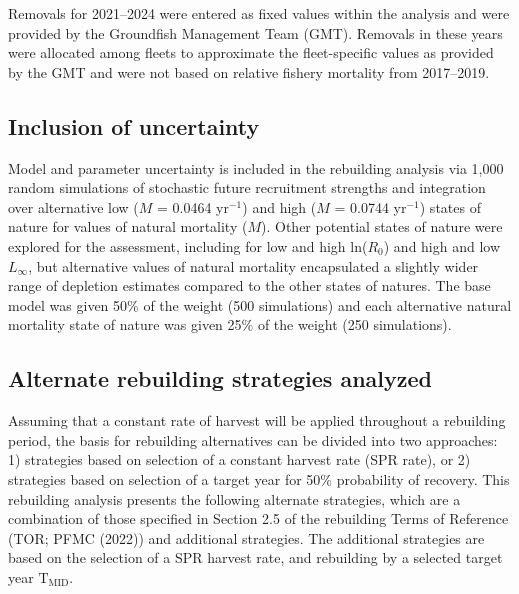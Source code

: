 \documentclass[11pt,
  letterpaper,
]{article}
\begin{document}
Removals for 2021--2024 were entered as fixed values within the analysis and were provided by the Groundfish Management Team (GMT). Removals in these years were allocated among fleets to approximate the fleet-specific values as provided by the GMT and were not based on relative fishery mortality from 2017--2019.

\hypertarget{inclusion-of-uncertainty}{%
\subsection{Inclusion of uncertainty}\label{inclusion-of-uncertainty}}

Model and parameter uncertainty is included in the rebuilding analysis via 1,000 random simulations of stochastic future recruitment strengths and integration over alternative low (\(M\) = 0.0464 yr\(^{-1}\)) and high (\(M\) = 0.0744 yr\(^{-1}\)) states of nature for values of natural mortality (\(M\)). Other potential states of nature were explored for the assessment, including for low and high ln(\(R_0\)) and high and low \(L_{\infty}\), but alternative values of natural mortality encapsulated a slightly wider range of depletion estimates compared to the other states of natures. The base model was given 50\(\%\) of the weight (500 simulations) and each alternative natural mortality state of nature was given 25\(\%\) of the weight (250 simulations).

\hypertarget{alternate-rebuilding-strategies-analyzed}{%
\subsection{Alternate rebuilding strategies analyzed}\label{alternate-rebuilding-strategies-analyzed}}

Assuming that a constant rate of harvest will be applied throughout a rebuilding period, the basis for rebuilding alternatives can be divided into two approaches: 1) strategies based on selection of a constant harvest rate (SPR rate), or 2) strategies based on selection of a target year for 50\(\%\) probability of recovery. This rebuilding analysis presents the following alternate strategies, which are a combination of those specified in Section 2.5 of the rebuilding Terms of Reference (TOR; PFMC (2022)) and additional strategies. The additional strategies are based on the selection of a SPR harvest rate, and rebuilding by a selected target year \(\text{T}_\text{MID}\).
\end{document}
